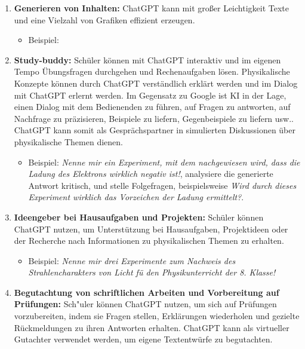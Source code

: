 \begin{enumerate}
\item \textbf{Generieren von Inhalten:} ChatGPT kann mit gro{\ss}er Leichtigkeit Texte und eine Vielzahl von Grafiken effizient erzeugen. 
	\begin{itemize} 
	\item Beispiel: 
	\end{itemize}

\item \textbf{Study-buddy:} Sch\"{u}ler k\"{o}nnen  mit ChatGPT interaktiv und im eigenen Tempo \"{U}bungsfragen durchgehen und Rechenaufgaben l\"{o}sen. Physikalische Konzepte k\"{o}nnen durch ChatGPT verst\"{a}ndlich erkl\"{a}rt werden und im Dialog mit ChatGPT erlernt werden. Im Gegensatz zu Google ist KI in der Lage, einen Dialog mit dem Bedienenden zu f\"{u}hren, auf Fragen zu antworten, auf Nachfrage zu pr\"{a}zisieren, Beispiele zu liefern, Gegenbeispiele zu liefern usw.. ChatGPT kann somit als Gespr\"{a}chspartner in simulierten Diskussionen \"{u}ber physikalische Themen dienen. 
	\begin{itemize}
	\item Beispiel: \glqq\emph{Nenne mir ein Experiment, mit dem nachgewiesen wird, dass die Ladung des Elektrons wirklich negativ ist!}\grqq,  analysiere die generierte Antwort kritisch, und stelle Folgefragen, beispielsweise \glqq\emph{Wird durch dieses Experiment wirklich das Vorzeichen der Ladung ermittelt?}\grqq.  
	\end{itemize}

\item \textbf{Ideengeber bei Hausaufgaben und Projekten:} Sch\"{u}ler k\"{o}nnen ChatGPT nutzen, um Unterst\"{u}tzung bei Hausaufgaben, Projektideen oder der Recherche nach Informationen zu physikalischen Themen zu erhalten. 
	\begin{itemize} 
	\item Beispiel: \glqq\emph{Nenne mir drei Experimente zum Nachweis des Strahlencharakters von Licht f\"{u} den Physikunterricht der 8. Klasse!}\grqq
	\end{itemize}

\item \textbf{Begutachtung von schriftlichen Arbeiten und Vorbereitung auf Pr\"{u}fungen:} Sch"{u}ler k\"{o}nnen ChatGPT nutzen, um sich auf Pr\"{u}fungen vorzubereiten, indem sie Fragen stellen, Erkl\"{a}rungen wiederholen und gezielte R\"{u}ckmeldungen zu ihren Antworten erhalten. ChatGPT kann als virtueller Gutachter verwendet werden, um eigene Textentw\"{u}rfe zu begutachten. 


\end{enumerate}
